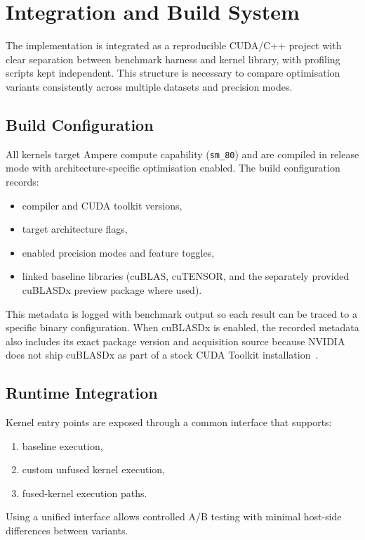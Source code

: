 \section{Integration and Build System}\label{sec:build-system}

The implementation is integrated as a reproducible CUDA/C++ project with clear
separation between benchmark harness and kernel library, with profiling scripts
kept independent.
This structure is necessary to compare optimisation variants consistently across
multiple datasets and precision modes.

\subsection{Build Configuration}

All kernels target Ampere compute capability (\texttt{sm\_80}) and are compiled
in release mode with architecture-specific optimisation enabled. The build
configuration records:

\begin{itemize}
  \item compiler and CUDA toolkit versions,
  \item target architecture flags,
  \item enabled precision modes and feature toggles,
  \item linked baseline libraries (cuBLAS, cuTENSOR, and the separately
    provided cuBLASDx preview package where used).
\end{itemize}

This metadata is logged with benchmark output so each result can be traced to a
specific binary configuration. When cuBLASDx is enabled, the recorded metadata
also includes its exact package version and acquisition source because NVIDIA
does not ship cuBLASDx as part of a stock CUDA Toolkit installation~\cite{cublas,nvidia-cublasdx-downloads}.

\subsection{Runtime Integration}

Kernel entry points are exposed through a common interface that supports:

\begin{enumerate}
  \item baseline execution,
  \item custom unfused kernel execution,
  \item fused-kernel execution paths.
\end{enumerate}

Using a unified interface allows controlled A/B testing with minimal host-side
differences between variants.
